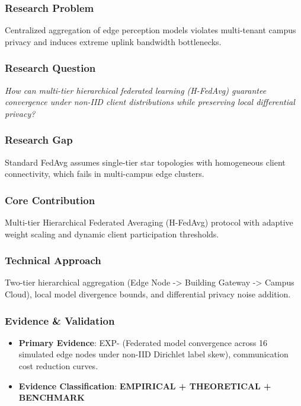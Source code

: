 \documentclass[11pt,letterpaper]{article}
\begin{document}
\subsubsection{Research Problem}
Centralized aggregation of edge perception models violates multi-\allowbreak tenant campus privacy and induces extreme uplink bandwidth bottlenecks.

\subsubsection{Research Question}
\begin{tcolorbox}[colback=blue!3!white,colframe=blue!50!black,title=Primary Scientific Question]
\textit{How can multi-\allowbreak tier hierarchical federated learning (H-\allowbreak FedAvg) guarantee convergence under non-\allowbreak IID client distributions while preserving local differential privacy?}
\end{tcolorbox}

\subsubsection{Research Gap}
Standard FedAvg assumes single-\allowbreak tier star topologies with homogeneous client connectivity, which fails in multi-\allowbreak campus edge clusters.

\subsubsection{Core Contribution}
Multi-\allowbreak tier Hierarchical Federated Averaging (H-\allowbreak FedAvg) protocol with adaptive weight scaling and dynamic client participation thresholds.

\subsubsection{Technical Approach}
Two-\allowbreak tier hierarchical aggregation (Edge Node -\allowbreak > Building Gateway -\allowbreak > Campus Cloud), local model divergence bounds, and differential privacy noise addition.

\subsubsection{Evidence \& Validation}
\begin{itemize}[leftmargin=*]
    \item \textbf{Primary Evidence}: EXP- (Federated model convergence across 16 simulated edge nodes under non-\allowbreak IID Dirichlet label skew), communication cost reduction curves.
    \item \textbf{Evidence Classification}: \textbf{EMPIRICAL + THEORETICAL + BENCHMARK}
\end{itemize}
\end{document}
